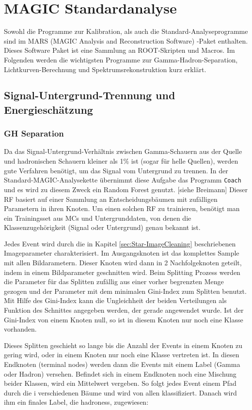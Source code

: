 \chapter{MAGIC Standardanalyse}
Sowohl die Programme zur Kalibration, als auch die Standard-Analyseprogramme sind im MARS (MAGIC Analysis and Reconstruction Software) -Paket enthalten.
Dieses Software Paket ist eine Sammlung an ROOT-Skripten und Macros.
Im Folgenden werden die wichtigsten Programme zur Gamma-Hadron-Separation, Lichtkurven-Berechnung und Spektrumsrekonstruktion kurz erklärt.


\section{Signal-Untergrund-Trennung und Energieschätzung}
\subsection{GH Separation}
Da das Signal-Untergrund-Verhältnis zwischen Gamma-Schauern aus der Quelle und hadronischen Schauern kleiner als 1\% ist (sogar für helle Quellen), werden gute Verfahren benötigt, um das Signal vom Untergrund zu trennen.
In der Standard-MAGIC-Analysekette übernimmt diese Aufgabe das Programm \texttt{Coach} und es wird zu diesem Zweck ein Random Forest genutzt. [siehe Breimann]
Dieser RF basiert auf einer Sammlung an Entscheidungsbäumen mit zufälligen Parametern in ihren Knoten.
Um einen solchen RF zu trainieren, benötigt man ein Trainingsset aus MCs und Untergrunddaten, von denen die Klassenzugehörigkeit (Signal oder Untergrund) genau bekannt ist.

Jedes Event wird durch die in Kapitel \ref{sec:Star-ImageCleaning} beschriebenen Imageparameter charakterisiert.
Im Ausgangsknoten ist das komplettes Sample mit allen Bildarametern.
Dieser Knoten wird dann in 2 Nachfolgeknoten geteilt, indem in einem Bildparameter geschnitten wird.
Beim Splitting Prozess werden die  Parameter für das Splitten zufällig aus einer vorher begrenzten Menge gezogen und der Parameter mit dem minimalen Gini-Index zum Splitten benutzt.
Mit Hilfe des Gini-Index kann die Ungleichheit der beiden Verteilungen als Funktion des Schnittes angegeben werden, der gerade angewendet wurde.
Ist der Gini-Index von einem Knoten null, so ist in diesem Knoten nur noch eine Klasse vorhanden.

Dieses Splitten geschieht so lange bis die Anzahl der Events in einem Knoten zu gering wird, oder in einem Knoten nur noch eine Klasse vertreten ist.
In diesen Endknoten (terminal nodes) werden dann die Events mit einem Label (Gamma oder Hadron) versehen. 
Befindet sich in einem Endknoten noch eine Mischung beider Klassen, wird ein Mittelwert vergeben.
So folgt jedes Event einem Pfad durch die i verschiedenen Bäume und wird von allen klassifiziert.
Danach wird ihm ein finales Label, die hadroness, zugewiesen:

